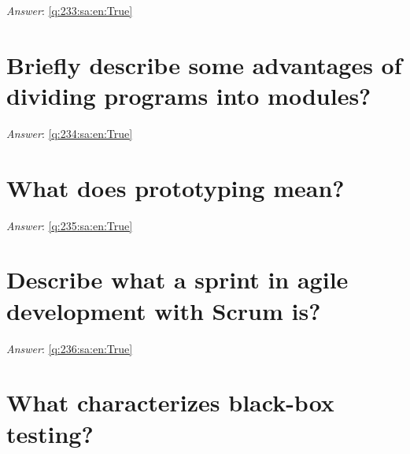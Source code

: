 \documentclass[a4paper,11pt,oneside]{book}
\begin{document}
\begin{sloppypar}
\noindent\makebox[\textwidth]{\hrulefill}

\vspace{1cm}

\textit{Answer}: \autoref{q:233:sa:en:True}



\section{Briefly describe some advantages of dividing programs into modules?}

\label{q:234:sa:en:False}

\vspace{2cm}

\noindent\makebox[\textwidth]{\hrulefill}

\vspace{1cm}

\textit{Answer}: \autoref{q:234:sa:en:True}



\section{What does prototyping mean?}

\label{q:235:sa:en:False}

\vspace{2cm}

\noindent\makebox[\textwidth]{\hrulefill}

\vspace{1cm}

\textit{Answer}: \autoref{q:235:sa:en:True}



\section{Describe what a sprint in agile development with Scrum is?}

\label{q:236:sa:en:False}

\vspace{2cm}

\noindent\makebox[\textwidth]{\hrulefill}

\vspace{1cm}

\textit{Answer}: \autoref{q:236:sa:en:True}



\section{What characterizes black-box testing?}


\end{sloppypar}
\end{document}
